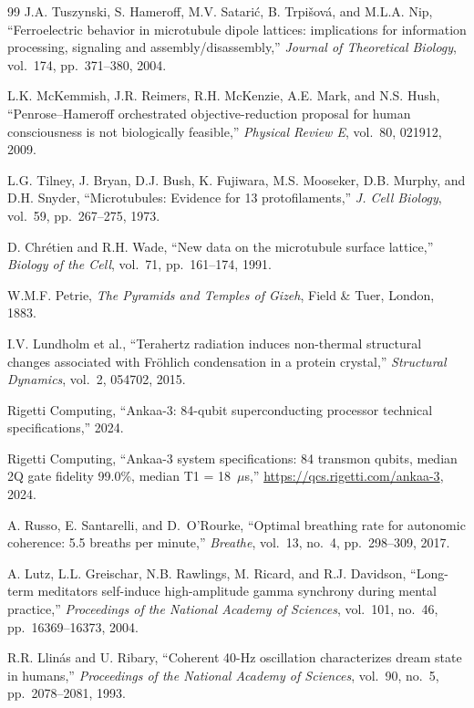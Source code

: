 \documentclass[12pt,a4paper]{article}
\theoremstyle{plain}
\theoremstyle{definition}
\begin{document}
\begin{thebibliography}{99}
J.A. Tuszynski, S. Hameroff, M.V. Sat\-ari\'c, B. Trpišov\'a, and M.L.A. Nip, ``Ferroelectric behavior in microtubule dipole lattices: implications for information processing, signaling and assembly/disassembly,'' \textit{Journal of Theoretical Biology}, vol.~174, pp.~371--380, 2004.

L.K. McKemmish, J.R. Reimers, R.H. McKenzie, A.E. Mark, and N.S. Hush, ``Penrose--Hameroff orchestrated objective-reduction proposal for human consciousness is not biologically feasible,'' \textit{Physical Review E}, vol.~80, 021912, 2009.

L.G. Tilney, J. Bryan, D.J. Bush, K. Fujiwara, M.S. Mooseker, D.B. Murphy, and D.H. Snyder, ``Microtubules: Evidence for 13 protofilaments,'' \textit{J. Cell Biology}, vol.~59, pp.~267--275, 1973.

D. Chr\'etien and R.H. Wade, ``New data on the microtubule surface lattice,'' \textit{Biology of the Cell}, vol.~71, pp.~161--174, 1991.

W.M.F. Petrie, \textit{The Pyramids and Temples of Gizeh}, Field \& Tuer, London, 1883.

I.V. Lundholm et al., ``Terahertz radiation induces non-thermal structural changes associated with Fr\"ohlich condensation in a protein crystal,'' \textit{Structural Dynamics}, vol.~2, 054702, 2015.

Rigetti Computing, ``Ankaa-3: 84-qubit superconducting processor technical specifications,'' 2024.

Rigetti Computing, ``Ankaa-3 system specifications: 84 transmon qubits, median 2Q gate fidelity 99.0\%, median T1 = 18~$\mu$s,'' \url{https://qcs.rigetti.com/ankaa-3}, 2024.

A. Russo, E. Santarelli, and D.~O'Rourke, ``Optimal breathing rate for autonomic coherence: 5.5 breaths per minute,'' \textit{Breathe}, vol.~13, no.~4, pp.~298--309, 2017.

A. Lutz, L.L. Greischar, N.B. Rawlings, M. Ricard, and R.J. Davidson, ``Long-term meditators self-induce high-amplitude gamma synchrony during mental practice,'' \textit{Proceedings of the National Academy of Sciences}, vol.~101, no.~46, pp.~16369--16373, 2004.

R.R. Llin\'as and U. Ribary, ``Coherent 40-Hz oscillation characterizes dream state in humans,'' \textit{Proceedings of the National Academy of Sciences}, vol.~90, no.~5, pp.~2078--2081, 1993.


\end{thebibliography}
\end{document}
